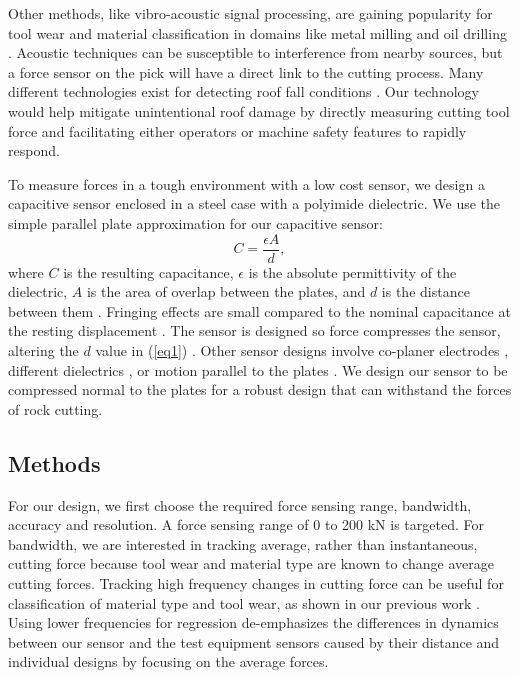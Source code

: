 Other methods, like vibro-acoustic signal processing, 
are gaining popularity for tool wear and material classification 
in domains like metal milling \cite{Cooper2020} and oil drilling \cite{Wang2023}.
Acoustic techniques can be susceptible to interference from nearby sources, 
but a force sensor on the pick will have a direct link to the cutting process.
Many different technologies exist for detecting 
roof fall conditions \cite{en15218312, SLAKER201783, alzahrani2017detection}.
Our technology would help mitigate unintentional roof damage by directly measuring
cutting tool force and facilitating either operators or machine safety features
to rapidly respond.

To measure forces in a tough environment with a low cost sensor, 
we design a capacitive sensor enclosed in a steel case with a polyimide dielectric. 
We use the simple parallel plate approximation for our capacitive sensor:
\begin{equation}
\label{eq1}
C = \frac{\epsilon A}{d},
\end{equation}
where $C$ is the resulting capacitance, $\epsilon$ is the absolute permittivity of the dielectric, 
$A$ is the area of overlap between the plates, and $d$ is the distance between them \cite{HyperPhysics}. 
Fringing effects are small compared to the nominal capacitance at the resting displacement \cite{Reichert2020}.
The sensor is designed so force compresses the sensor, altering the $d$ value in (\ref{eq1}) \cite{Dobrzynska2012, Zhu2020}. 
Other sensor designs involve co-planer electrodes \cite{Lu2016, Zaitsev2017, Barile2019}, different dielectrics \cite{Nelu2019},
or motion parallel to the plates \cite{Kim2005, Liu2016, Prit2019}.
We design our sensor to be compressed normal to the plates for a robust design that 
can withstand the forces of rock cutting.

\subsection{Methods}

For our design, we first choose the required 
force sensing range, bandwidth, accuracy and resolution.
A force sensing range of 0 to 200 kN is targeted.
For bandwidth, we are interested in tracking average,
 rather than instantaneous, cutting force because tool wear and material type 
are known to change average cutting forces.
Tracking high frequency changes in cutting force can be useful 
for classification of material type and tool wear, as shown in our previous work \cite{oltmanns2023low}.
Using lower frequencies for regression de-emphasizes the 
differences in dynamics between our sensor and the test equipment sensors
caused by their distance and individual designs by focusing on the average forces.

